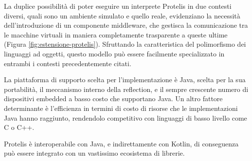 La duplice possibilità di poter eseguire un interprete Protelis in due contesti
diversi, quali sono un ambiente simulato e quello reale, evidenziano la
necessità dell'introduzione di un componente middleware, che gestisca la
comunicazione tra le macchine virtuali in maniera completamente trasparente a
queste ultime (Figura \ref{fig:estensione-protelis}). Sfruttando la
caratteristica del polimorfismo dei linguaggi ad oggetti, questo modello può
essere facilmente specializzato in entrambi i contesti precedentemente citati.

La piattaforma di supporto scelta per l'implementazione è Java, scelta per la
sua portabilità, il meccanismo interno della reflection, e il sempre crescente
numero di dispositivi embedded a basso costo che supportano Java. Un altro
fattore determinante è l'efficienza in termini di costo di risorse che le
implementazioni Java hanno raggiunto, rendendolo competitivo con linguaggi di
basso livello come C o C++.

Protelis è interoperabile con Java, e indirettamente con Kotlin, di conseguenza
può essere integrato con un vastissimo ecosistema di librerie.
